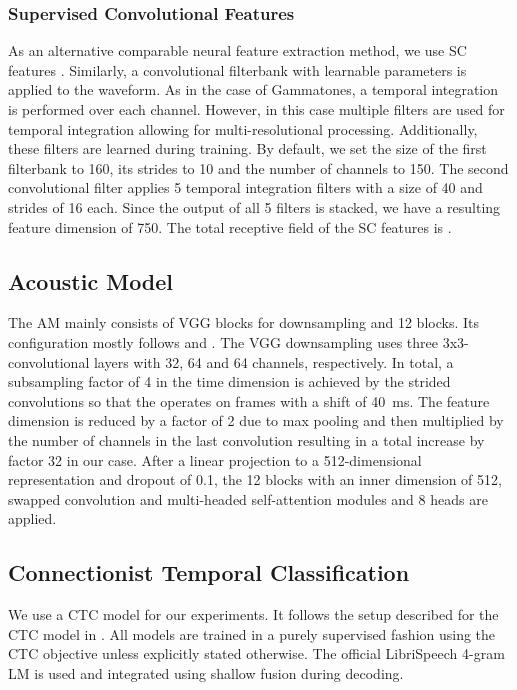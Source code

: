 \documentclass{INTERSPEECH2023}
\begin{document}
\subsubsection{Supervised Convolutional Features}
As an alternative comparable neural feature extraction method, we use \gls{SC} features \cite{tuske2018:waveform, vieting2021waveform}.
Similarly, a convolutional filterbank with learnable parameters is applied to the waveform.
As in the case of Gammatones, a temporal integration is performed over each channel.
However, in this case multiple filters are used for temporal integration allowing for multi-resolutional processing.
Additionally, these filters are learned during training.
By default, we set the size of the first filterbank to 160, its strides to 10 and the number of channels to 150.
The second convolutional filter applies 5 temporal integration filters with a size of 40 and strides of 16 each.
Since the output of all 5 filters is stacked, we have a resulting feature dimension of 750.
The total receptive field of the \gls{SC} features is .

\subsection{Acoustic Model}
The \gls{AM} mainly consists of \gls{VGG} \addref blocks for downsampling and 12 \conformer blocks.
Its configuration mostly follows \cite{zeineldeen2022conformer} and \cite{zhou2022efficient}.
The \gls{VGG} downsampling uses three 3x3-convolutional layers with 32, 64 and 64 channels, respectively.
In total, a subsampling factor of 4 in the time dimension is achieved by the strided convolutions so that the \conformer operates on frames with a shift of \SI{40}{\milli\second}.
The feature dimension is reduced by a factor of 2 due to max pooling and then multiplied by the number of channels in the last convolution resulting in a total increase by factor 32 in our case.
After a linear projection to a 512-dimensional representation and dropout of 0.1, the 12 \conformer blocks with an inner dimension of 512, swapped convolution and multi-headed self-attention modules and 8 heads are applied.


\subsection{Connectionist Temporal Classification}
We use a \gls{CTC} model for our experiments.
It follows the setup described for the \gls{CTC} model in \cite{zhou2022efficient}.
All models are trained in a purely supervised fashion using the \gls{CTC} objective unless explicitly stated otherwise.
The official LibriSpeech 4-gram \gls{LM} is used and integrated using shallow fusion \cite{gulcehre2015shallow} during decoding.
\end{document}
